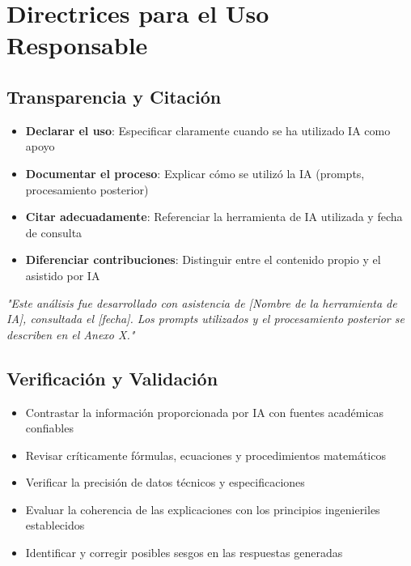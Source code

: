 \documentclass[11pt, letterpaper]{article}
\begin{document}
	\section{Directrices para el Uso Responsable}
	
	\subsection{Transparencia y Citación}
	
	\begin{itemize}
		\item \textbf{Declarar el uso}: Especificar claramente cuando se ha utilizado IA como apoyo
		\item \textbf{Documentar el proceso}: Explicar cómo se utilizó la IA (prompts, procesamiento posterior)
		\item \textbf{Citar adecuadamente}: Referenciar la herramienta de IA utilizada y fecha de consulta
		\item \textbf{Diferenciar contribuciones}: Distinguir entre el contenido propio y el asistido por IA
	\end{itemize}
	
	\begin{tcolorbox}[colback=gray!5, colframe=uteqGray, title={Ejemplo de citación}]
		\textit{"Este análisis fue desarrollado con asistencia de [Nombre de la herramienta de IA], consultada el [fecha]. Los prompts utilizados y el procesamiento posterior se describen en el Anexo X."}
	\end{tcolorbox}
	
	\subsection{Verificación y Validación}
	
	\begin{itemize}
		\item Contrastar la información proporcionada por IA con fuentes académicas confiables
		\item Revisar críticamente fórmulas, ecuaciones y procedimientos matemáticos
		\item Verificar la precisión de datos técnicos y especificaciones
		\item Evaluar la coherencia de las explicaciones con los principios ingenieriles establecidos
		\item Identificar y corregir posibles sesgos en las respuestas generadas
	\end{itemize}
	
\end{document}

